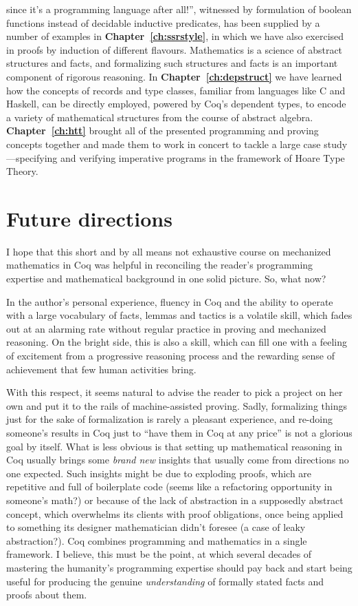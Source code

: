 since it's a programming language after all!'', witnessed by
formulation of boolean functions instead of decidable inductive
predicates, has been supplied by a number of examples in
\textbf{Chapter~\ref{ch:ssrstyle}}, in which we have also exercised in
proofs by induction of different flavours. Mathematics is a science of
abstract structures and facts, and formalizing such structures and
facts is an important component of rigorous reasoning. In
\textbf{Chapter~\ref{ch:depstruct}} we have learned how the concepts
of records and type classes, familiar from languages like C and
Haskell, can be directly employed, powered by Coq's dependent types,
to encode a variety of mathematical structures from the course of
abstract algebra. \textbf{Chapter~\ref{ch:htt}} brought all of the
presented programming and proving concepts together and made them
to work in concert to tackle a large case study---specifying and
verifying imperative programs in the framework of Hoare Type Theory.

\section*{Future directions}

I hope that this short and by all means not exhaustive course on
mechanized mathematics in Coq was helpful in reconciling the reader's
programming expertise and mathematical background in one solid
picture. So, what now?

In the author's personal experience, fluency in Coq and the ability to
operate with a large vocabulary of facts, lemmas and tactics is a
volatile skill, which fades out at an alarming rate without regular
practice in proving and mechanized reasoning. On the bright side, this
is also a skill, which can fill one with a feeling of excitement from
a progressive reasoning process and the rewarding sense of achievement
that few human activities bring.

With this respect, it seems natural to advise the reader to pick a
project on her own and put it to the rails of machine-assisted
proving. Sadly, formalizing things just for the sake of formalization
is rarely a pleasant experience, and re-doing someone's results in Coq
just to ``have them in Coq at any price'' is not a glorious goal by
itself. What is less obvious is that setting up mathematical reasoning
in Coq usually brings some \emph{brand new} insights that usually come
from directions no one expected. Such insights might be due to
exploding proofs, which are repetitive and full of boilerplate code
(seems like a refactoring opportunity in someone's math?) or because
of the lack of abstraction in a supposedly abstract concept, which
overwhelms its clients with proof obligations, once being applied to
something its designer mathematician didn't foresee (a case of leaky
abstraction?). Coq combines programming and mathematics in a single
framework. I believe, this must be the point, at which several decades
of mastering the humanity's programming expertise should pay back and
start being useful for producing the genuine \emph{understanding} of
formally stated facts and proofs about them. 


 \begin{coqdoccode}
\coqdocemptyline
\end{coqdoccode}
